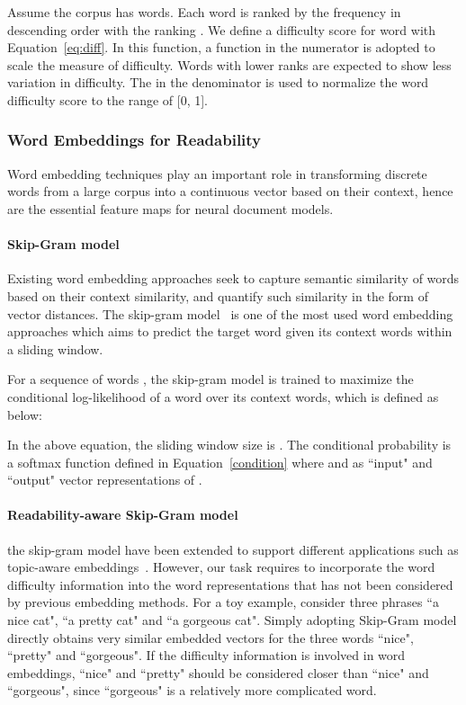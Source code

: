 \documentclass[runningheads]{llncs}
\begin{document}
Assume the corpus has  words. Each word  is ranked by the frequency in descending order with the ranking . We define a difficulty score for word  with Equation~\ref{eq:diff}. In this function, a  function in the numerator is adopted to scale the measure of difficulty. Words with lower ranks are expected to show less variation in difficulty. The  in the denominator is used to normalize the word difficulty score to the range of [0, 1].



 \subsubsection{Word Embeddings for Readability}
 Word embedding techniques play an important role in transforming discrete words from a large corpus into a continuous vector based on their context, hence are the essential feature maps for neural document models.
 \paragraph{Skip-Gram model}
 Existing word embedding approaches seek to capture semantic similarity of words based on their context similarity, and quantify such similarity in the form of vector distances.
 The skip-gram model~\cite{word2vec} is one of the most used word embedding approaches which aims to predict the target word given its context words within a sliding window.

 For a sequence of words , the skip-gram model is trained to maximize the conditional log-likelihood of a word over its context words, which is defined as below:

 

 In the above equation, the sliding window size is . The conditional probability   is a softmax function defined in Equation~\ref{condition} where  and   as ``input" and ``output" vector representations of .

 


 \paragraph{Readability-aware Skip-Gram model}
 the skip-gram model have been extended to support different applications such as topic-aware embeddings~\cite{topicalEmbed,topicalEmbed2}. However, our task requires to incorporate the word difficulty information into the word representations that has not been considered by previous embedding methods.
 For a toy example, consider three phrases ``a nice cat", ``a pretty cat" and ``a gorgeous cat". Simply adopting Skip-Gram model directly obtains very similar embedded vectors for the three words ``nice", ``pretty" and ``gorgeous". If the difficulty information is involved in word embeddings, ``nice" and ``pretty" should be considered closer than ``nice" and ``gorgeous", since ``gorgeous" is a relatively more complicated word.
\end{document}
